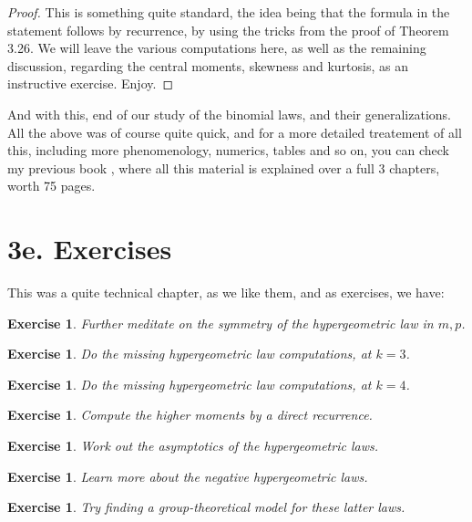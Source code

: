 \documentclass[12pt]{amsbook}
\newtheorem{exercise}[theorem]{Exercise}
\begin{document}
\begin{proof}
This is something quite standard, the idea being that the formula in the statement follows by recurrence, by using the tricks from the proof of Theorem 3.26. We will leave the various computations here, as well as the remaining discussion, regarding the central moments, skewness and kurtosis, as an instructive exercise. Enjoy.
\end{proof}

And with this, end of our study of the binomial laws, and their generalizations. All the above was of course quite quick, and for a more detailed treatement of all this, including more phenomenology, numerics, tables and so on, you can check my previous book \cite{ba1}, where all this material is explained over a full 3 chapters, worth 75 pages.

\section*{3e. Exercises}

This was a quite technical chapter, as we like them, and as exercises, we have:

\begin{exercise}
Further meditate on the symmetry of the hypergeometric law in $m,p$.
\end{exercise}

\begin{exercise}
Do the missing hypergeometric law computations, at $k=3$.
\end{exercise}

\begin{exercise}
Do the missing hypergeometric law computations, at $k=4$.
\end{exercise}

\begin{exercise}
Compute the higher moments by a direct recurrence.
\end{exercise}

\begin{exercise}
Work out the asymptotics of the hypergeometric laws.
\end{exercise}

\begin{exercise}
Learn more about the negative hypergeometric laws.
\end{exercise}

\begin{exercise}
Try finding a group-theoretical model for these latter laws.
\end{exercise}
\end{document}
